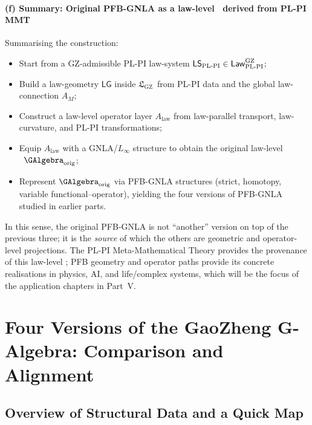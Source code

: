 \documentclass[11pt]{book}
\theoremstyle{plain}
\theoremstyle{definition}
\newcommand{\GZLS}{\ensuremath{\mathfrak{L}_{\mathrm{GZ}}}}       \newcommand{\GZLT}{\ensuremath{M_{!w}}}                           \newcommand{\GZLOC}{\ensuremath{A_M}}                             \newcommand{\GZLCurv}{\ensuremath{\mathcal{F}_{\mathrm{law}}}}
\begin{document}
\subsubsection*{(f) Summary: Original PFB-GNLA as a law-level \GAlgebra\ derived from PL-PI MMT}

Summarising the construction:

\begin{itemize}
  \item Start from a GZ-admissible PL-PI law-system
        $\mathsf{LS}_{\mathrm{PL\text- PI}}\in
         \mathsf{Law}_{\mathrm{PL\text- PI}}^{\mathrm{GZ}}$;
  \item Build a law-geometry $\mathsf{LG}$ inside \GZLS\ from PL-PI
        data and the global law-connection \GZLOC;
  \item Construct a law-level operator layer $A_{\mathrm{law}}$ from
        law-parallel transport, law-curvature, and PL-PI transformations;
  \item Equip $A_{\mathrm{law}}$ with a GNLA/$L_\infty$ structure to 
        obtain the original law-level \\ \GAlgebra\
        $\GAlgebra_{\mathrm{orig}}$;
  \item Represent $\GAlgebra_{\mathrm{orig}}$ via PFB-GNLA structures
        (strict, homotopy, variable functional--operator), yielding the
        four versions of PFB-GNLA studied in earlier parts.
\end{itemize}

In this sense, the original PFB-GNLA is not “another” version on top of
the previous three; it is the \emph{source} of which the others are
geometric and operator-level projections. The PL-PI Meta-Mathematical
Theory provides the provenance of this law-level \GAlgebra; PFB
geometry and operator paths provide its concrete realisations in
physics, AI, and life/complex systems, which will be the focus of the application
chapters in Part~V.



\chapter[Four Versions of the G-Algebra: Comparison]{Four Versions of the GaoZheng G-Algebra: Comparison and Alignment}


\section{Overview of Structural Data and a Quick Map}
\end{document}
